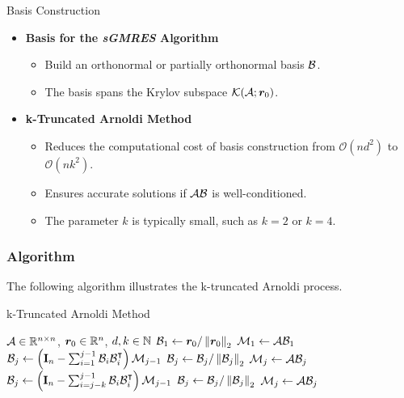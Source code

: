\begin{frame}{Basis Construction}
    \begin{itemize}
        \item \textbf{Basis for the \textit{sGMRES} Algorithm}
        \begin{itemize}
            \item Build an orthonormal or partially orthonormal basis $\mathcal{B}$.
            \item The basis spans the Krylov subspace $\mathcal{K}(\mathcal{A}; \bm{r}_0)$.
        \end{itemize}
    
        \item \textbf{k-Truncated Arnoldi Method}
        \begin{itemize}
            \item Reduces the computational cost of basis construction from $\mathcal{O}(n d^2)$ to $\mathcal{O}(n k^2)$.
            \item Ensures accurate solutions if $\mathcal{A} \mathcal{B}$ is well-conditioned.
            \item The parameter $k$ is typically small, such as $k = 2$ or $k = 4$.
        \end{itemize}
    \end{itemize}
\end{frame}

\begin{frame}[fragile]
    \frametitle{Algorithm}

    The following algorithm illustrates the k-truncated Arnoldi process.

    \begin{algorithm}[H]
    \caption{k-Truncated Arnoldi Method} \label{alg:arnoldi}
    \begin{algorithmic}
    \Require $\mathcal{A} \in \mathbb{R}^{n \times n}$, $\bm{r}_0 \in \mathbb{R}^{n}$, $d, k \in \mathbb{N}$
    \State $\mathcal{B}_1 \gets \bm{r}_0 / \left\lVert \bm{r}_0 \right\rVert_2$
    \State $\mathcal{M}_1 \gets \mathcal{A} \mathcal{B}_1$
        \State $\mathcal{B}_j \gets \left( \mathbf{I}_n - \sum_{i=1}^{j-1} \mathcal{B}_i \mathcal{B}_i^{\intercal} \right) \mathcal{M}_{j-1}$
        \State $\mathcal{B}_j \gets \mathcal{B}_j / \left\lVert \mathcal{B}_j \right\rVert_2$
        \State $\mathcal{M}_j \gets \mathcal{A} \mathcal{B}_j$
    \EndFor
        \State $\mathcal{B}_j \gets \left( \mathbf{I}_n - \sum_{i=j-k}^{j-1} \mathcal{B}_i \mathcal{B}_i^{\intercal} \right) \mathcal{M}_{j-1}$
        \State $\mathcal{B}_j \gets \mathcal{B}_j / \left\lVert \mathcal{B}_j \right\rVert_2$
        \State $\mathcal{M}_j \gets \mathcal{A} \mathcal{B}_j$
    \EndFor
    \end{algorithmic}
    \end{algorithm}

\end{frame}

